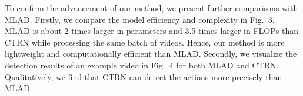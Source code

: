 \documentclass{bmvc2k}
\begin{document}
To confirm the advancement of our method, we present further comparisons with MLAD. 
Firstly, we compare the model efficiency and complexity in Fig.~{\color{red}3}. MLAD is about 2 times larger in parameters and 3.5 times larger in FLOPs than CTRN while processing the same batch of videos. Hence, our method is more lightweight and computationally efficient than MLAD. 
Secondly, we visualize the detection results of an example video in Fig.~{\color{red}4} for both MLAD and CTRN. 
Qualitatively, we find that CTRN can detect the actions more precisely than MLAD. 






\begin{figure}
\begin{floatrow}

\end{floatrow}
\end{figure}
\end{document}
